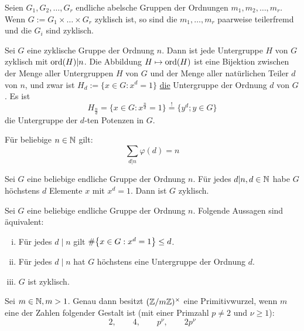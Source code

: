 \begin{falko} \label{F4.5}
	Seien $G_1,G_2,\dots,G_r$ endliche abelsche Gruppen der Ordnungen $m_1,m_2,\dots,m_r$. Wenn $G:= G_1 \times \dots \times G_r$ zyklisch ist, so sind die $m_1,\dots,m_r$ paarweise teilerfremd und die $G_i$ sind zyklisch.
\end{falko}

\begin{falko} \label{F4.6}
	Sei $G$ eine zyklische Gruppe der Ordnung $n$. Dann ist jede Untergruppe $H$ von $G$ zyklisch mit $\operatorname{ord}(H) | n$. Die Abbildung $H \mapsto \operatorname{ord}(H)$ ist eine Bijektion zwischen der Menge aller Untergruppen $H$ von $G$ und der Menge aller natürlichen Teiler $d$ von $n$, und zwar ist $H_d := \{x \in G : x^d = 1\}$ \underline{die} Untergruppe der Ordnung $d$ von $G$. Es ist
	\[ H_{\frac{n}{d}} = \{x \in G : x^{\frac{n}{d}}=1 \} \overset{!}{=} \{y^d ; y \in G\} \]
	die Untergruppe der $d$-ten Potenzen in $G$.
\end{falko}

	Für beliebige $n \in \mathbb{N}$ gilt:
	\[ \sum_{d | n} \varphi(d) = n \]
	
	Sei $G$ eine beliebige endliche Gruppe der Ordnung $n$. Für jedes $d | n, d \in \mathbb{N}$ habe $G$ höchstens $d$ Elemente $x$ mit $x^d = 1$. Dann ist $G$ zyklisch.
	
\begin{falko} \label{F4.7}
	Sei $G$ eine beliebige endliche Gruppe der Ordnung $n$. Folgende Aussagen sind äquivalent:
	\begin{enumerate}[(i)]
		\item Für jedes $d \mid n$ gilt $\#\penbrace*{x \in G : x^d = 1} \leq d$.
		\item Für jedes $d \mid n$ hat $G$ höchstens eine Untergruppe der Ordnung $d$.
		\item $G$ ist zyklisch.
	\end{enumerate}
\end{falko}
	
\begin{satz} \label{satz_4.4}
	Sei $m \in \mathbb{N}, m > 1$. Genau dann besitzt $(\mathbb{Z}/m\mathbb{Z})^\times$ eine Primitivwurzel, wenn $m$ eine der Zahlen folgender Gestalt ist (mit einer Primzahl $p \neq 2$ und $\nu \geq 1$):
	\[ 2, \qquad 4, \qquad p^\nu, \qquad 2p^\nu \]
\end{satz}
\cleardoubleemptypage